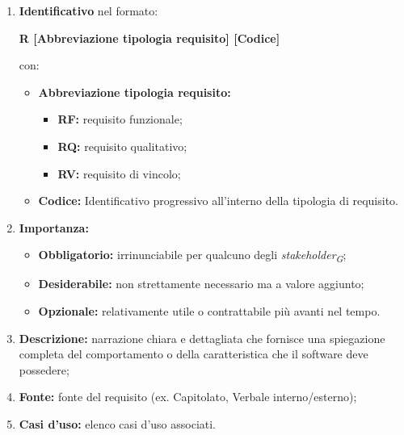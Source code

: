 \begin{enumerate}
    \item \textbf{Identificativo} nel formato:\\
          \begin{center}
              \textbf{R [Abbreviazione tipologia requisito] [Codice]}
          \end{center}
          con:
          \begin{itemize}
              \item \textbf{Abbreviazione tipologia requisito:}
                    \begin{itemize}
                        \item \textbf{RF:} requisito funzionale;
                        \item \textbf{RQ:} requisito qualitativo;
                        \item \textbf{RV:} requisito di vincolo;
                    \end{itemize}
              \item \textbf{Codice:} Identificativo progressivo all'interno della tipologia di requisito.
          \end{itemize}
    \item \textbf{Importanza:}
          \begin{itemize}
              \item \textbf{Obbligatorio:} irrinunciabile per qualcuno degli \textit{stakeholder}\textsubscript{\textit{G}};
              \item \textbf{Desiderabile:} non strettamente necessario ma a valore aggiunto;
              \item \textbf{Opzionale:} relativamente utile o contrattabile più avanti nel tempo.
          \end{itemize}
    \item \textbf{Descrizione:} narrazione chiara e dettagliata che fornisce una spiegazione completa del comportamento o della caratteristica che il software deve possedere;
    \item \textbf{Fonte:} fonte del requisito (ex. Capitolato, Verbale interno/esterno);
    \item \textbf{Casi d'uso:} elenco casi d'uso associati.
\end{enumerate}
